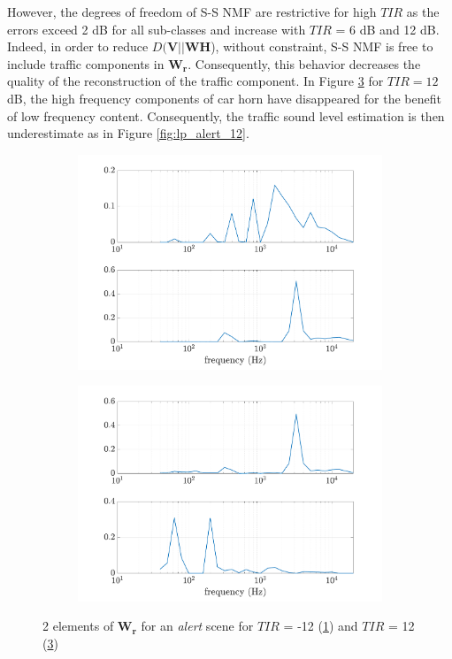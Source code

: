 \documentclass[twocolumn,a4paper,10pt]{article}
\begin{document}
However, the degrees of freedom of S-S NMF are restrictive for high $TIR$ as the errors exceed 2 dB for all sub-classes and increase with $TIR$ = 6 dB and 12 dB. Indeed, in order to reduce $D(\mathbf{V} \vert \vert \mathbf{WH}$), without constraint, S-S NMF is free to include traffic components in $\mathbf{W_r}$. Consequently, this behavior decreases the quality of the reconstruction of the traffic component. In Figure \ref{fig:Y_alert_12} for $TIR=12$ dB, the high frequency components of car horn have disappeared for the benefit of low frequency content. Consequently, the traffic sound level estimation is then underestimate as in Figure \ref{fig:lp_alert_12}. \\

\begin{figure}
    \centering
    \begin{subfigure}[t]{0.45\textwidth}
        \centering
        \includegraphics[width=\linewidth]{figures/Y_alert_-12.pdf}
        \caption{}
        \label{fig:Y_alert-12}
    \end{subfigure}%
    \hfill
    \begin{subfigure}[t]{0.45\textwidth}
        \centering
        \includegraphics[width=\linewidth]{figures/Y_alert_12.pdf}
        \caption{}
		\label{fig:Y_alert_12}
    \end{subfigure}
    \caption{2 elements of $\mathbf{W_r}$ for an \textit{alert} scene for $TIR$ = -12 (\ref{fig:Y_alert-12}) and $TIR$ = 12 (\ref{fig:Y_alert_12})}
\end{figure}
\end{document}
